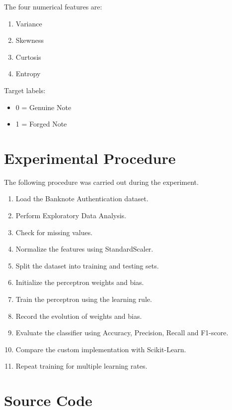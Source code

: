 \documentclass[12pt,a4paper]{article}
\begin{document}
The four numerical features are:

\begin{enumerate}
\item Variance
\item Skewness
\item Curtosis
\item Entropy
\end{enumerate}

Target labels:

\begin{itemize}
\item 0 = Genuine Note
\item 1 = Forged Note
\end{itemize}


\section{Experimental Procedure}

The following procedure was carried out during the experiment.

\begin{enumerate}
\item Load the Banknote Authentication dataset.
\item Perform Exploratory Data Analysis.
\item Check for missing values.
\item Normalize the features using StandardScaler.
\item Split the dataset into training and testing sets.
\item Initialize the perceptron weights and bias.
\item Train the perceptron using the learning rule.
\item Record the evolution of weights and bias.
\item Evaluate the classifier using Accuracy, Precision, Recall and F1-score.
\item Compare the custom implementation with Scikit-Learn.
\item Repeat training for multiple learning rates.
\end{enumerate}


\section{Source Code}
\end{document}
